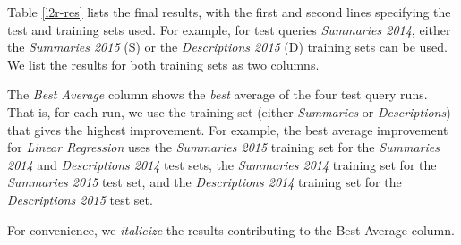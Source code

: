 Table \ref{l2r-res} lists the final results, with the first and second lines
specifying the test and training sets used. For example, for test queries \emph{Summaries 2014},
either the \emph{Summaries 2015} (S) or the \emph{Descriptions 2015} (D) training sets can be used.
We list the results for both training sets as two columns.

The \emph{Best Average} column shows the \emph{best} average of the four test query runs.
That is, for each run, we use the training set (either \emph{Summaries} or \emph{Descriptions}) that gives the highest
improvement. For example, the best average improvement for \emph{Linear Regression} uses the \emph{Summaries 2015} training set for the
\emph{Summaries 2014} and \emph{Descriptions 2014} test sets,
the \emph{Summaries 2014} training set for the \emph{Summaries 2015} test set, and
the \emph{Descriptions 2014} training set for the \emph{Descriptions 2015} test set.

For convenience, we \textit{italicize} the results contributing to the Best Average column.


